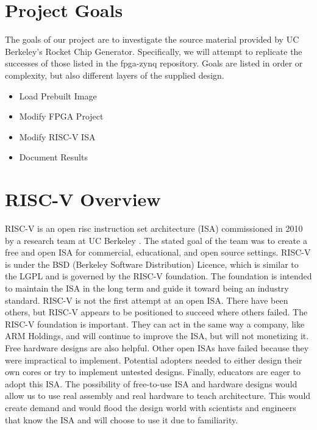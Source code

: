 \documentclass[journal]{IEEEtran}
\begin{document}

\section{Project Goals}
The goals of our project are to investigate the source material provided by UC Berkeley's Rocket Chip Generator. Specifically, we will attempt to replicate the successes of those listed in the fpga-zynq \cite{fgpa-zynq} repository. Goals are listed in order or complexity, but also different layers of the supplied design. 
\begin{itemize}
\item{Load Prebuilt Image}%
\item{Modify FPGA Project}
\item{Modify RISC-V ISA}
\item{Document Results}
\end{itemize}

\section{RISC-V Overview}
RISC-V is an open risc instruction set architecture (ISA) commissioned in 2010 by a research team at UC Berkeley \cite{Waterman:EECS-2016-118}. The stated goal of the team was to create a free and open ISA for commercial, educational, and open source settings. RISC-V is under the BSD (Berkeley Software Distribution) Licence, which is similar to the LGPL and is governed by the RISC-V foundation. The foundation is intended to maintain the ISA in the long term and guide it toward being an industry standard.\newline
RISC-V is not the first attempt at an open ISA. There have been others, but RISC-V appears to be positioned to succeed where others failed. The RISC-V foundation is important. They can act in the same way a company, like ARM Holdings, and will continue to improve the ISA, but will not monetizing it. Free hardware designs are also helpful. Other open ISAs have failed because they were impractical to implement. Potential adopters needed to either design their own cores or try to implement untested designs. Finally, educators are eager to adopt this ISA. The possibility of free-to-use ISA and hardware designs would allow us to use real assembly and real hardware to teach architecture. This would create demand and would flood the design world with scientists and engineers that know the ISA and will choose to use it due to familiarity.
\end{document}
